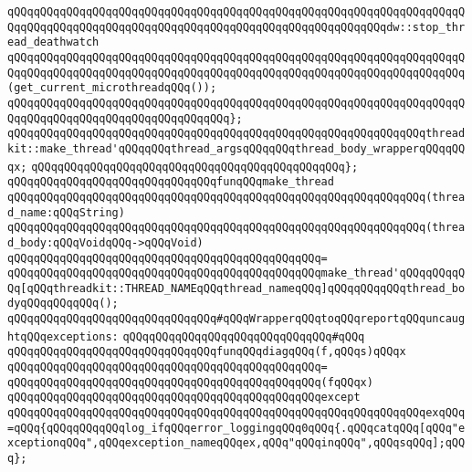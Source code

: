 \newline
\verb|qQQqqQQqqQQqqQQqqQQqqQQqqQQqqQQqqQQqqQQqqQQqqQQqqQQqqQQqqQQqqQQqqQQqqQQqqQQqqQQqqQQqqQQqqQQqqQQqqQQqqQQqqQQqqQQqqQQqqQQqqQQqqQQqdw::stop_thread_deathwatch|\newline
\verb|qQQqqQQqqQQqqQQqqQQqqQQqqQQqqQQqqQQqqQQqqQQqqQQqqQQqqQQqqQQqqQQqqQQqqQQqqQQqqQQqqQQqqQQqqQQqqQQqqQQqqQQqqQQqqQQqqQQqqQQqqQQqqQQqqQQqqQQqqQQq(get_current_microthreadqQQq());|\newline
\verb|qQQqqQQqqQQqqQQqqQQqqQQqqQQqqQQqqQQqqQQqqQQqqQQqqQQqqQQqqQQqqQQqqQQqqQQqqQQqqQQqqQQqqQQqqQQqqQQqqQQqqQQq};|\newline
\newline
\verb|qQQqqQQqqQQqqQQqqQQqqQQqqQQqqQQqqQQqqQQqqQQqqQQqqQQqqQQqqQQqqQQqthreadkit::make_thread'qQQqqQQqthread_argsqQQqqQQqthread_body_wrapperqQQqqQQqx;|\newline
\verb|qQQqqQQqqQQqqQQqqQQqqQQqqQQqqQQqqQQqqQQqqQQqqQQq};|\newline
\newline
\verb|qQQqqQQqqQQqqQQqqQQqqQQqqQQqqQQqfunqQQqmake_thread|\newline
\verb|qQQqqQQqqQQqqQQqqQQqqQQqqQQqqQQqqQQqqQQqqQQqqQQqqQQqqQQqqQQqqQQq(thread_name:qQQqString)|\newline
\verb|qQQqqQQqqQQqqQQqqQQqqQQqqQQqqQQqqQQqqQQqqQQqqQQqqQQqqQQqqQQqqQQq(thread_body:qQQqVoidqQQq->qQQqVoid)|\newline
\verb|qQQqqQQqqQQqqQQqqQQqqQQqqQQqqQQqqQQqqQQqqQQqqQQq=|\newline
\verb|qQQqqQQqqQQqqQQqqQQqqQQqqQQqqQQqqQQqqQQqqQQqqQQqmake_thread'qQQqqQQqqQQq[qQQqthreadkit::THREAD_NAMEqQQqthread_nameqQQq]qQQqqQQqqQQqthread_bodyqQQqqQQqqQQq();|\newline
\newline
\newline
\verb|qQQqqQQqqQQqqQQqqQQqqQQqqQQqqQQq#qQQqWrapperqQQqtoqQQqreportqQQquncaughtqQQqexceptions:|\newline
\verb|qQQqqQQqqQQqqQQqqQQqqQQqqQQqqQQq#qQQq|\newline
\verb|qQQqqQQqqQQqqQQqqQQqqQQqqQQqqQQqfunqQQqdiagqQQq(f,qQQqs)qQQqx|\newline
\verb|qQQqqQQqqQQqqQQqqQQqqQQqqQQqqQQqqQQqqQQqqQQqqQQq=|\newline
\verb|qQQqqQQqqQQqqQQqqQQqqQQqqQQqqQQqqQQqqQQqqQQqqQQq(fqQQqx)|\newline
\verb|qQQqqQQqqQQqqQQqqQQqqQQqqQQqqQQqqQQqqQQqqQQqqQQqexcept|\newline
\verb|qQQqqQQqqQQqqQQqqQQqqQQqqQQqqQQqqQQqqQQqqQQqqQQqqQQqqQQqqQQqqQQqexqQQq=qQQq{qQQqqQQqqQQqlog_ifqQQqerror_loggingqQQq0qQQq{.qQQqcatqQQq[qQQq"exceptionqQQq",qQQqexception_nameqQQqex,qQQq"qQQqinqQQq",qQQqsqQQq];qQQq};|\newline
